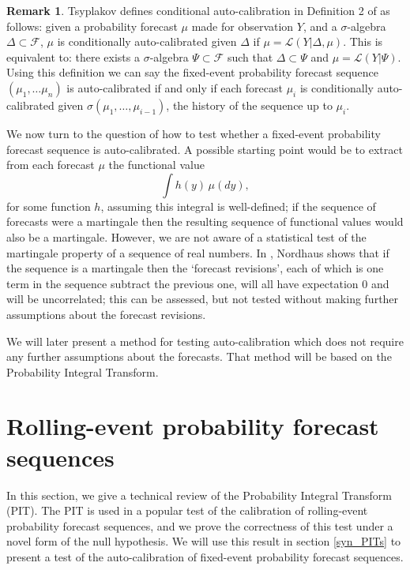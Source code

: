 \documentclass[aap]{imsart}
\theoremstyle{plain}
\theoremstyle{definition}
\newtheorem*{remark}{Remark}
\begin{document}
\begin{remark}
Tsyplakov defines conditional auto-calibration in Definition 2 of \cite{Tsp20} as follows: given a probability forecast $\mu$ made for observation $Y$, and a $\sigma$-algebra $\Delta \subset \mathcal{F}$, $\mu$ is conditionally auto-calibrated given $\Delta$ if $\mu = \mathcal{L}(Y|\Delta, \mu)$. This is equivalent to: there exists a $\sigma$-algebra $\Psi \subset \mathcal{F}$ such that $\Delta \subset \Psi$ and $\mu = \mathcal{L}(Y|\Psi)$. Using this definition we can say the fixed-event probability forecast sequence $(\mu_1, \ldots \mu_n)$ is auto-calibrated if and only if each forecast $\mu_i$ is conditionally auto-calibrated given $\sigma(\mu_1, \ldots, \mu_{i-1})$, the history of the sequence up to $\mu_i$.
\end{remark}

We now turn to the question of how to test whether a fixed-event probability forecast sequence is auto-calibrated. A possible starting point would be to extract from each forecast $\mu$ the functional value
\begin{equation*}
  \int h(y) \, \mu(dy),
\end{equation*}
for some function $h$, assuming this integral is well-defined; if the sequence of forecasts were a martingale then the resulting sequence of functional values would also be a martingale. However, we are not aware of a statistical test of the martingale property of a sequence of real numbers. In \cite{nrd87}, Nordhaus shows that if the sequence is a martingale then the `forecast revisions', each of which is one term in the sequence subtract the previous one, will all have expectation $0$ and will be uncorrelated; this can be assessed, but not tested without making further assumptions about the forecast revisions.

We will later present a method for testing auto-calibration which does not require any further assumptions about the forecasts. That method will be based on the Probability Integral Transform.

\section{Rolling-event probability forecast sequences}\label{rolling_event}
In this section, we give a technical review of the Probability Integral Transform (PIT). The PIT is used in a popular test of the calibration of rolling-event probability forecast sequences, and we prove the correctness of this test under a novel form of the null hypothesis. We will use this result in section \ref{syn_PITs} to present a test of the auto-calibration of fixed-event probability forecast sequences.
\end{document}
